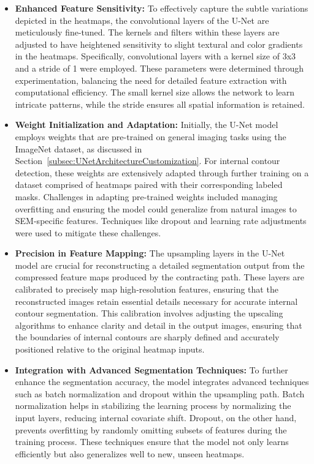 \documentclass[preprint,12pt]{elsarticle}
\begin{document}
\begin{itemize}
    \item \textbf{Enhanced Feature Sensitivity:} To effectively capture the subtle variations depicted in the heatmaps, the convolutional layers of the U-Net are meticulously fine-tuned. The kernels and filters within these layers are adjusted to have heightened sensitivity to slight textural and color gradients in the heatmaps. Specifically, convolutional layers with a kernel size of 3x3 and a stride of 1 were employed. These parameters were determined through experimentation, balancing the need for detailed feature extraction with computational efficiency. The small kernel size allows the network to learn intricate patterns, while the stride ensures all spatial information is retained.

    \item \textbf{Weight Initialization and Adaptation:} Initially, the U-Net model employs weights that are pre-trained on general imaging tasks using the ImageNet dataset, as discussed in Section~\ref{subsec:UNetArchitectureCustomization}. For internal contour detection, these weights are extensively adapted through further training on a dataset comprised of heatmaps paired with their corresponding labeled masks. Challenges in adapting pre-trained weights included managing overfitting and ensuring the model could generalize from natural images to SEM-specific features. Techniques like dropout and learning rate adjustments were used to mitigate these challenges.

    \item \textbf{Precision in Feature Mapping:} The upsampling layers in the U-Net model are crucial for reconstructing a detailed segmentation output from the compressed feature maps produced by the contracting path. These layers are calibrated to precisely map high-resolution features, ensuring that the reconstructed images retain essential details necessary for accurate internal contour segmentation. This calibration involves adjusting the upscaling algorithms to enhance clarity and detail in the output images, ensuring that the boundaries of internal contours are sharply defined and accurately positioned relative to the original heatmap inputs.

    \item \textbf{Integration with Advanced Segmentation Techniques:} To further enhance the segmentation accuracy, the model integrates advanced techniques such as batch normalization and dropout within the upsampling path. Batch normalization helps in stabilizing the learning process by normalizing the input layers, reducing internal covariate shift. Dropout, on the other hand, prevents overfitting by randomly omitting subsets of features during the training process. These techniques ensure that the model not only learns efficiently but also generalizes well to new, unseen heatmaps.


\end{itemize}
\end{document}
